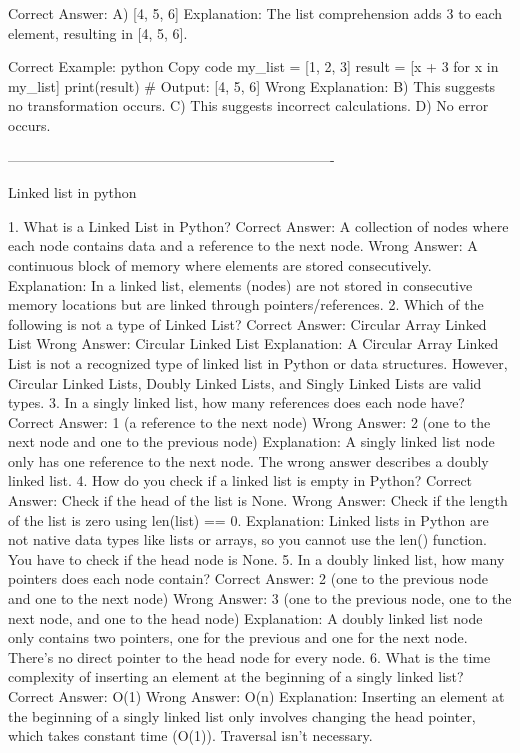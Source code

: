 Correct Answer: A) [4, 5, 6]
Explanation: The list comprehension adds 3 to each element, resulting in [4, 5, 6].

Correct Example:
python
Copy code
my_list = [1, 2, 3]
result = [x + 3 for x in my_list]
print(result)  # Output: [4, 5, 6]
Wrong Explanation:
B) This suggests no transformation occurs.
C) This suggests incorrect calculations.
D) No error occurs.

----------------------------------------------------------------------

Linked list in python

1. What is a Linked List in Python?
Correct Answer: A collection of nodes where each node contains data and a reference to the next node.
Wrong Answer: A continuous block of memory where elements are stored consecutively.
Explanation: In a linked list, elements (nodes) are not stored in consecutive memory locations but are linked through pointers/references.
2. Which of the following is not a type of Linked List?
Correct Answer: Circular Array Linked List
Wrong Answer: Circular Linked List
Explanation: A Circular Array Linked List is not a recognized type of linked list in Python or data structures. However, Circular Linked Lists, Doubly Linked Lists, and Singly Linked Lists are valid types.
3. In a singly linked list, how many references does each node have?
Correct Answer: 1 (a reference to the next node)
Wrong Answer: 2 (one to the next node and one to the previous node)
Explanation: A singly linked list node only has one reference to the next node. The wrong answer describes a doubly linked list.
4. How do you check if a linked list is empty in Python?
Correct Answer: Check if the head of the list is None.
Wrong Answer: Check if the length of the list is zero using len(list) == 0.
Explanation: Linked lists in Python are not native data types like lists or arrays, so you cannot use the len() function. You have to check if the head node is None.
5. In a doubly linked list, how many pointers does each node contain?
Correct Answer: 2 (one to the previous node and one to the next node)
Wrong Answer: 3 (one to the previous node, one to the next node, and one to the head node)
Explanation: A doubly linked list node only contains two pointers, one for the previous and one for the next node. There’s no direct pointer to the head node for every node.
6. What is the time complexity of inserting an element at the beginning of a singly linked list?
Correct Answer: O(1)
Wrong Answer: O(n)
Explanation: Inserting an element at the beginning of a singly linked list only involves changing the head pointer, which takes constant time (O(1)). Traversal isn't necessary.
